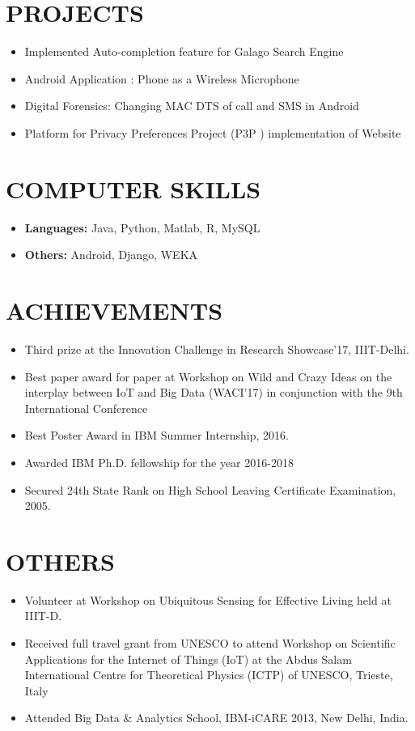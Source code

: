 \documentclass{res}
\begin{document}
\begin{resume}
 
 \section{PROJECTS}
   \begin{itemize}
  \item Implemented Auto-completion feature for Galago Search Engine
   \item Android Application : Phone as a Wireless Microphone
      \item Digital Forensics: Changing MAC DTS of call and SMS in Android

      \item Platform for Privacy Preferences Project (P3P ) implementation of Website
   \end{itemize}  
 
  \section{COMPUTER SKILLS}
 \begin{itemize}
 \item \textbf{Languages: } Java, Python, Matlab, R, MySQL
 \item \textbf{Others: } Android, Django, WEKA  
 \end{itemize}
 
 \section{ACHIEVEMENTS}
 \begin{itemize}
 \item Third prize at the Innovation Challenge in Research Showcase'17, IIIT-Delhi.
 \item Best paper award for paper at Workshop on Wild and Crazy Ideas on the interplay between IoT and Big Data (WACI'17) in conjunction with the 9th International Conference 
  \item Best Poster Award in IBM Summer Internship, 2016.
  \item Awarded IBM Ph.D. fellowship for the year 2016-2018

 \item Secured 24th State Rank on High School Leaving Certificate Examination, 2005.
 \end{itemize}
 
 \section{OTHERS}
 \begin{itemize}
 \item Volunteer at Workshop on Ubiquitous Sensing for Effective Living held at IIIT-D.
  \item Received full travel grant from UNESCO to attend Workshop on Scientific Applications for the Internet of Things (IoT) at the Abdus Salam International Centre for Theoretical Physics (ICTP) of UNESCO, Trieste, Italy
 \item Attended Big Data \& Analytics School, IBM-iCARE 2013, New Delhi, India.
 \end{itemize}
 


\end{resume}
\end{document}
